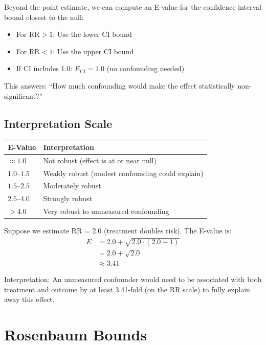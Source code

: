 Beyond the point estimate, we can compute an E-value for the confidence interval bound closest to the null:
\begin{itemize}
    \item For $\text{RR} > 1$: Use the lower CI bound
    \item For $\text{RR} < 1$: Use the upper CI bound
    \item If CI includes 1.0: $E_{\text{CI}} = 1.0$ (no confounding needed)
\end{itemize}

This answers: ``How much confounding would make the effect statistically non-significant?''

\subsection{Interpretation Scale}

\begin{center}
\begin{tabular}{lp{8cm}}
\toprule
E-Value & Interpretation \\
\midrule
$\approx 1.0$ & Not robust (effect is at or near null) \\
$1.0$--$1.5$ & Weakly robust (modest confounding could explain) \\
$1.5$--$2.5$ & Moderately robust \\
$2.5$--$4.0$ & Strongly robust \\
$> 4.0$ & Very robust to unmeasured confounding \\
\bottomrule
\end{tabular}
\end{center}

\begin{example}
Suppose we estimate RR = 2.0 (treatment doubles risk). The E-value is:
\begin{align}
E &= 2.0 + \sqrt{2.0 \cdot (2.0 - 1)} \\
  &= 2.0 + \sqrt{2.0} \\
  &\approx 3.41
\end{align}

Interpretation: An unmeasured confounder would need to be associated with both treatment and outcome by at least 3.41-fold (on the RR scale) to fully explain away this effect.
\end{example}

\section{Rosenbaum Bounds}
\label{sec:rosenbaum}


